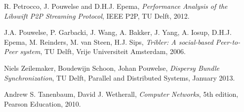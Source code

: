 \documentclass[finalreport.main.tex]{subfile}
\begin{document}
\pagestyle{fancy}
\fancyhead{}
\fancyhead[LE, LO] {\today}



\tableofcontents

\pagebreak


\begin{thebibliography}{9}

   R. Petrocco, J. Pouwelse and D.H.J. Epema,
  \emph{Performance Analysis of the Libswift P2P Streaming Protocol},
  IEEE P2P, TU Delft,
  2012.

   J.A. Pouwelse, P. Garbacki, J. Wang, A. Bakker, J. Yang, A. Iosup, D.H.J. Epema, M. Reinders, M. van Steen, H.J. Sips,
  \emph{Tribler: A social-based Peer-to-Peer system},
  TU Delft, Vrije Universiteit Amsterdam,
  2006.

   Niels Zeilemaker, Boudewijn Schoon, Johan Pouwelse,
  \emph{Dispersy Bundle Synchronization},
  TU Delft, Parallel and Distributed Systems,
  January 2013.

		 Andrew S. Tanenbaum, David J. Wetherall,
 		\emph{Computer Networks},
		5th edition,
		Pearson Education,
		2010.

\end{thebibliography}
\end{document}
